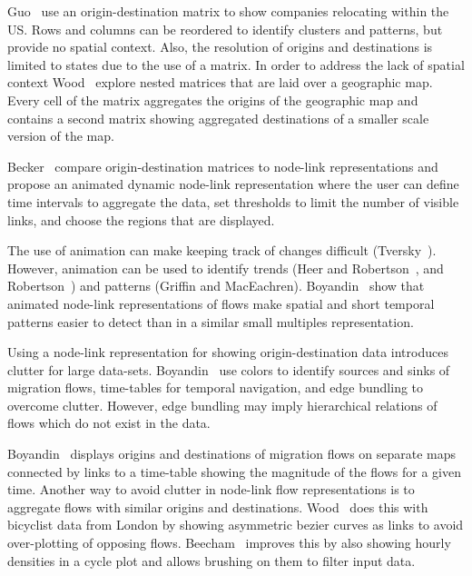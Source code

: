 Guo~\etal\cite{Guo2006} use an origin-destination matrix
to show companies relocating within the US.
Rows and columns can be reordered to identify clusters
and patterns, but provide no spatial context.
Also, the resolution of origins and destinations is limited
to states due to the use of a matrix.
In order to address the lack of spatial context
Wood~\etal\cite{Wood2002} explore nested matrices
that are laid over a geographic map.
Every cell of the matrix aggregates the origins
of the geographic map and contains
a second matrix showing aggregated destinations of
a smaller scale version of the map.

Becker~\etal\cite{Becker1995} compare
origin-destination matrices to node-link representations
and propose an animated dynamic node-link representation
where the user can define time intervals to aggregate the data,
set thresholds to limit the number of visible links,
and choose the regions that are displayed.

The use of animation can make keeping track of changes
difficult (Tversky~\etal\cite{Tversky2002}).
However, animation can be used to
identify trends (Heer and Robertson~\cite{Heer2007},
and Robertson~\etal\cite{Robertson}) and
patterns (Griffin and MacEachren\cite{Griffin2006}).
Boyandin~\etal\cite{Boyandin2012} show that animated
node-link representations of flows make spatial and
short temporal patterns easier to detect than in
a similar small multiples representation.

Using a node-link representation for showing origin-destination
data introduces clutter for large data-sets.
Boyandin~\etal\cite{Boyandin2008} use colors to identify
sources and sinks of migration flows,
time-tables for temporal navigation, and
edge bundling to overcome clutter.
However, edge bundling may imply hierarchical
relations of flows which do not exist in the data.

Boyandin~\etal\cite{Boyandin2011} displays origins and
destinations of migration flows on separate maps connected
by links to a time-table showing the magnitude of the flows
for a given time.
Another way to avoid clutter in node-link
flow representations is to aggregate flows with
similar origins and destinations.
Wood~\etal\cite{Wood2011} does this with bicyclist data from London
by showing asymmetric bezier curves as links to avoid
over-plotting of opposing flows.
Beecham~\etal\cite{Beecham2012} improves
this by also showing hourly densities in a cycle plot and
allows brushing on them to filter input data.
